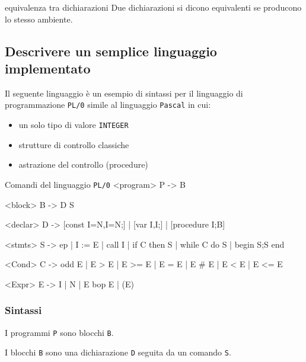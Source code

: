 
\begin{mydef}{equivalenza tra dichiarazioni}
    Due dichiarazioni si dicono equivalenti se producono lo stesso ambiente.
\end{mydef}

\subsection{Descrivere un semplice linguaggio implementato}
Il seguente linguaggio è un esempio di sintassi per il linguaggio di programmazione \texttt{PL/0} simile al linguaggio \texttt{Pascal} in cui:
\begin{itemize}[label=$\triangleright$, itemsep=\smallskipamount]
    \item un solo tipo di valore \texttt{INTEGER}
    \item strutture di controllo classiche
    \item astrazione del controllo (procedure)
\end{itemize}

\begin{bnfcode}{Comandi del linguaggio \texttt{PL/0}}
    <program>   P -> B

    <block>     B -> D S

    <declar>    D -> [const I=N{,I=N};] | [var I{,I};] | 
                     [procedure I;B]

    <stmts>     S -> ep | I := E | call I | if C then S | 
                     while C do S | begin S{;S} end
    
    <Cond>      C -> odd E | E > E | E >= E | E = E | E # E | 
                     E < E | E <= E

    <Expr>      E -> I | N | E bop E | (E)
\end{bnfcode}

\subsubsection{Sintassi}
I programmi \texttt{P} sono blocchi \texttt{B}.

\smallskip
I blocchi \texttt{B} sono una dichiarazione \texttt{D} seguita da un comando \texttt{S}.



